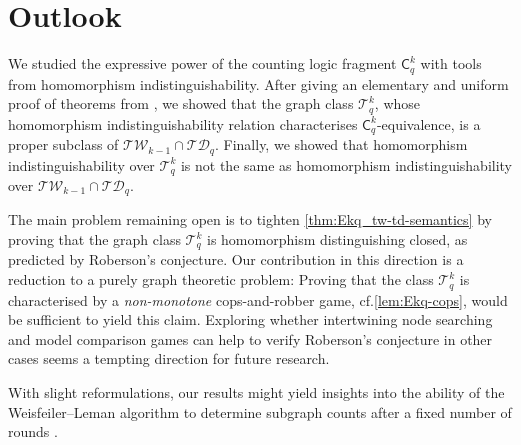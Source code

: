 \documentclass[10pt,a4paper]{article}
\newcommand{\Ekq}{\ensuremath{\mathcal{T}_{q}^{k}}}
\begin{document}
\section{Outlook}
We studied the expressive power of the counting logic fragment $\mathsf{C}^k_q$ with tools from homomorphism indistinguishability. After giving an elementary and uniform proof of theorems from \cite{dvorak_recognizing_2010,grohe_counting_2020,dawar_lovasz-type_2021}, we showed that the graph class $\Ekq$, whose homomorphism indistinguishability relation characterises $\mathsf{C}^k_q$-equivalence, is a proper subclass of $\mathcal{TW}_{k-1} \cap \mathcal{TD}_q$. Finally, we showed that homomorphism indistinguishability over $\Ekq$ is not the same as homomorphism indistinguishability over $\mathcal{TW}_{k-1} \cap \mathcal{TD}_q$.

The main problem remaining open is to tighten \cref{thm:Ekq_tw-td-semantics} by proving that the graph class $\Ekq$ is homomorphism distinguishing closed, as predicted by Roberson's conjecture. Our contribution in this direction is a reduction to a purely graph theoretic problem: Proving that the class $\Ekq$ is characterised by a \emph{non-monotone} cops-and-robber game, cf.\@ \cref{lem:Ekq-cops}, would be sufficient to yield this claim. Exploring whether intertwining node searching and model comparison games can help to verify Roberson's conjecture in other cases seems a tempting direction for future research.

With slight reformulations, our results might yield insights into the ability of the Weisfeiler--Leman algorithm to determine subgraph counts after a fixed number of rounds \cite{rattan_weisfeiler-leman_2023,neuen_homomorphism-distinguishing_2023}. 
\newpage
\end{document}
